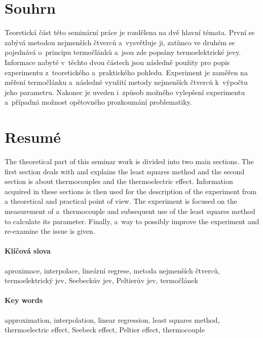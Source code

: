 \section[Souhrn (Resumé)]{Souhrn}
Teoretická část této seminární práce je rozdělena na dvě hlavní témata.
První se zabývá metodou nejmenších čtverců a~vysvětluje ji, zatímco ve
druhém se pojednává o~principu termočlánků a~jsou zde popsány termoelektrické
jevy. Informace nabyté v~těchto dvou částech jsou následně použity pro popis
experimentu z~teoretického a~praktického pohledu. Experiment je zaměřen na
měření termočlánku a~následné využití metody nejmenších čtverců k~výpočtu jeho
parametru. Nakonec je uveden i~způsob možného vylepšení experimentu a~případná
možnost opětovného prozkoumání problematiky.

\section*{Resumé}
The theoretical part of this seminar work is divided into two main sections. The first
section deals with and explains the least squares method and the second section is
about thermocouples and the thermoelectric effect. Information acquired in these
sections is then used for the description of the experiment from a theoretical and
practical point of view. The experiment is focused on the measurement of
a~thermocouple and subsequent use of the least squares method to calculate its
parameter. Finally, a~way to possibly improve the experiment and re-examine the
issue is given.



\paragraph{Klíčová slova}
aproximace, interpolace, lineární regrese, metoda nejmenších čtverců,
termoelektrický jev, Seebeckův jev, Peltierův jev, termočlánek

\paragraph{Key words}
approximation, interpolation, linear regression, least squares method,
thermoelectric effect, Seebeck effect, Peltier effect, thermocouple


